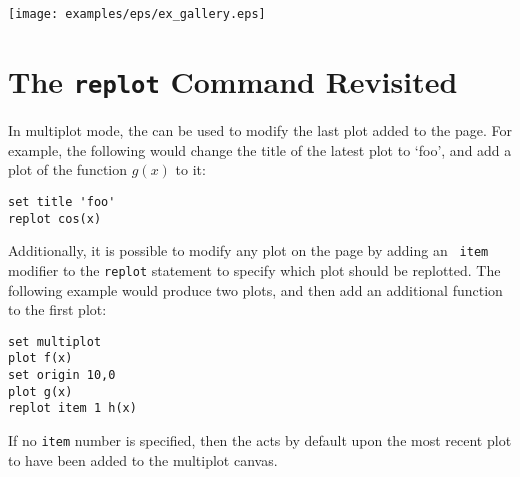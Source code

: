 {\newline
{}\newline
}\\{\footnotesize
{}\newline
{}\newline
{}\newline
{}\newline
{}\newline
}\\{\footnotesize
{}\newline
{}\newline
{}
}\vspace{3mm}

\centerline{\texttt{[image: examples/eps/ex\_gallery.eps]}}

\section{The {\tt replot} Command Revisited}

In multiplot mode, the  can be used to modify the last plot
added to the page. For example, the following would change the title of the
latest plot to `foo', and add a plot of the function $g(x)$ to it:

\begin{verbatim}
set title 'foo'
replot cos(x)
\end{verbatim}

Additionally, it is possible to modify any plot on the page by adding an {\tt
item} modifier to the {\tt replot} statement to specify which plot should be
replotted.  The following example would produce two plots, and then add an
additional function to the first plot:

\begin{verbatim}
set multiplot
plot f(x)
set origin 10,0
plot g(x)
replot item 1 h(x)
\end{verbatim}

If no {\tt item} number is specified, then the  acts by default
upon the most recent plot to have been added to the multiplot canvas.

